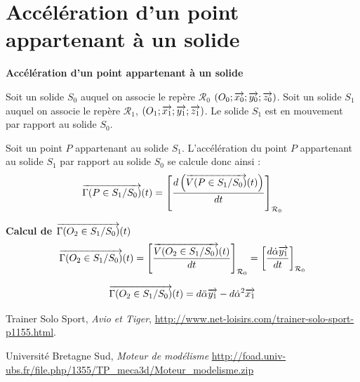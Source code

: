 \documentclass[11pt,oneside]{article}
\begin{document}
\section{Accélération d'un point appartenant à un solide}
\begin{defi}
\textbf{Accélération d'un point appartenant à un solide}

Soit un solide $S_0$ auquel on associe le repère $\mathcal{R}_0$ $\left(O_0;\overrightarrow{x_0};\overrightarrow{y_0};\overrightarrow{z_0} \right)$.  Soit un solide $S_1$ auquel on associe le repère $\mathcal{R}_1$,  $\left(O_1;\overrightarrow{x_1};\overrightarrow{y_1};\overrightarrow{z_1} \right)$. Le solide $S_1$ est en mouvement par rapport au solide $S_0$. 


Soit un point $P$ appartenant au solide $S_1$. L'accélération du point $P$ appartenant au solide $S_1$ par rapport au solide $S_0$ se calcule donc ainsi : 
$$
\overrightarrow{\Gamma(P\in S_1/S_0)}(t) = \left[\dfrac{d\left( \overrightarrow{V(P\in S_1/S_0)}(t)\right)}{dt}\right]_{\mathcal{R}_0}
$$

\end{defi}
\begin{exemple}
\textbf{Calcul de $\overrightarrow{\Gamma(O_2\in S_1/S_0)}(t)$}
$$\overrightarrow{\Gamma(O_2\in S_1/S_0)}(t)
=\left[\dfrac{\overrightarrow{V(O_2\in S_1/S_0)}(t)}{dt}\right]_{\mathcal{R}_0}
=\left[
\dfrac{d\dot{\alpha}\overrightarrow{y_1}}{dt}
\right]_{\mathcal{R}_0}
$$

$$\overrightarrow{\Gamma(O_2\in S_1/S_0)}(t)
=
d\ddot{\alpha}\overrightarrow{y_1}-d\dot{\alpha}^2\overrightarrow{x_1}
$$

\end{exemple}

\begin{thebibliography}{2}
   Trainer Solo Sport, \textit{Avio et Tiger}, \url{http://www.net-loisirs.com/trainer-solo-sport-p1155.html}.

 Université Bretagne Sud, \textit{Moteur de modélisme} \url{http://foad.univ-ubs.fr/file.php/1355/TP_meca3d/Moteur_modelisme.zip}

\end{thebibliography}
\end{document}
